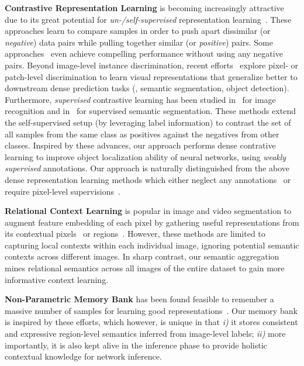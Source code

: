 \documentclass[10pt,twocolumn,letterpaper]{article}
\begin{document}
\noindent\textbf{Contrastive Representation Learning}  is becoming increasingly attractive due to its great potential for \textit{un-/self-supervised} representation learning~\cite{sohn2016improved,oord2018representation,wu2018unsupervised,tian2020contrastive,chen2020simple,he2020momentum}. These approaches learn to compare samples in order to push apart dissimilar (or \emph{negative}) data pairs while pulling together similar (or \emph{positive}) pairs. Some approaches~\cite{caron2018deep,grill2020bootstrap,chen2021exploring} even achieve compelling performance without using any negative pairs. Beyond image-level instance discrimination, recent efforts~\cite{chaitanya2020contrastive,wang2021dense,xie2021propagate} explore pixel- or patch-level discrimination to learn visual representations that generalize better to downstream dense prediction tasks (\eg, semantic segmentation, object detection). Furthermore, \textit{supervised} contrastive learning has been studied in~\cite{khosla2020supervised} for image recognition and in~\cite{wang2021exploring} for supervised semantic segmentation. These methods extend the self-supervised setup (by leveraging label information) to contrast the set of all samples from the same class as positives against {the} negatives from other classes. Inspired by these advances, our approach performs dense contrative learning to improve object localization ability of neural networks, using \textit{weakly supervised} annotations. Our approach is naturally distinguished from the above dense representation learning methods which either neglect any annotations~\cite{chaitanya2020contrastive,wang2021dense,xie2021propagate} or require pixel-level supervisions~\cite{wang2021exploring}. 



\noindent\textbf{Relational Context Learning} is popular in image and video segmentation to augment feature embedding of each pixel by gathering useful representations from  its contextual pixels~\cite{zhang2018context,fu2019dual} or regions~\cite{chen20182,yuan2020object}. However, these methods are limited to capturing local contexts within each individual image, ignoring potential semantic contexts across different images. In sharp contrast, our semantic aggregation mines relational semantics across all images of  the entire dataset to gain more informative context learning.

\noindent\textbf{Non-Parametric Memory Bank} has been found feasible to remember a massive number of samples for learning good representations~\cite{wu2018unsupervised,he2020momentum,wang2020cross,wang2021exploring,misra2020self}. Our memory bank is inspired by these efforts, which however, is  unique in that \emph{i)} it stores consistent and expressive region-level semantics inferred from image-level labels; \emph{ii)} more importantly, it is also kept alive in the inference phase to provide holistic contextual knowledge for network inference.
\end{document}
